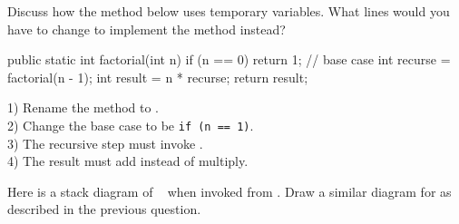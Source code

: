 \Q Discuss how the  method below uses temporary variables.
What lines would you have to change to implement the  method instead?

\begin{multicols}{2}

\vspace{1ex}
\begin{javalst}
public static int factorial(int n) {
    if (n == 0) {
        return 1;  // base case
    }
    int recurse = factorial(n - 1);
    int result = n * recurse;
    return result;
}
\end{javalst}

\columnbreak

\vspace*{0pt}
\begin{answer}[6em]
1) Rename the method to . \\[1ex]
2) Change the base case to be \texttt{if (n == 1)}. \\[1ex]
3) The recursive step must invoke . \\[1ex]
4) The result must add instead of multiply.
\end{answer}

\end{multicols}


\Q \label{diagram}
Here is a stack diagram of ~ when invoked from .
Draw a similar diagram for  as described in the previous question.

